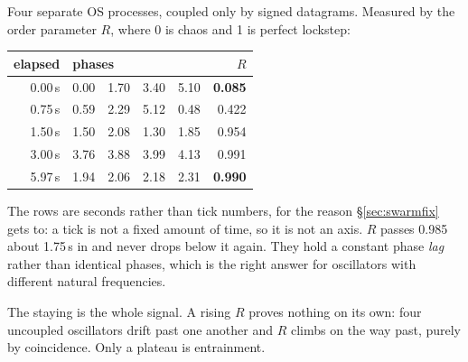 Four separate OS processes, coupled only by signed datagrams. Measured by
the order parameter $R$, where 0 is chaos and 1 is perfect lockstep:

\begin{center}
\footnotesize
\begin{tabular}{rlr}
\toprule
\textbf{elapsed} & \textbf{phases} & \textbf{$R$}\\
\midrule
0.00\,s & 0.00\ \ 1.70\ \ 3.40\ \ 5.10 & \textbf{0.085}\\
0.75\,s & 0.59\ \ 2.29\ \ 5.12\ \ 0.48 & 0.422\\
1.50\,s & 1.50\ \ 2.08\ \ 1.30\ \ 1.85 & 0.954\\
3.00\,s & 3.76\ \ 3.88\ \ 3.99\ \ 4.13 & 0.991\\
5.97\,s & 1.94\ \ 2.06\ \ 2.18\ \ 2.31 & \textbf{0.990}\\
\bottomrule
\end{tabular}
\end{center}

The rows are seconds rather than tick numbers, for the reason
\S\ref{sec:swarmfix} gets to:
a tick is not a fixed amount of time, so it is not an axis. $R$ passes 0.985
about 1.75\,s in and never drops below it again. They hold a constant phase
\emph{lag} rather than identical phases, which is the right answer for
oscillators with different natural frequencies.

The staying is the whole signal. A rising $R$ proves nothing on its own: four
uncoupled oscillators drift past one another and $R$ climbs on the way past,
purely by coincidence. Only a plateau is entrainment.

